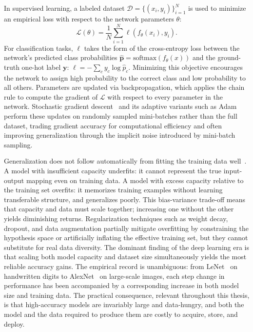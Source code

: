 \begin{foldable}
  In supervised learning, a labeled dataset $\mathcal{D} = \{(x_i, y_i)\}_{i=1}^{N}$ is used to minimize an empirical loss with respect to the network parameters $\theta$:
  \begin{equation}
    \label{eq:21-background-deeplearning-loss-supervised}
    \mathcal{L}(\theta) = \frac{1}{N}\sum_{i=1}^{N} \ell(f_{\theta}(x_i), y_i).
  \end{equation}
  For classification tasks, $\ell$ takes the form of the cross-entropy loss between the network's predicted class probabilities $\hat{\mathbf{p}} = \text{softmax}(f_\theta(x))$ and the ground-truth one-hot label $\mathbf{y}$: $\ell = -\sum_c y_c \log \hat{p}_c$.
  Minimizing this objective encourages the network to assign high probability to the correct class and low probability to all others.
  Parameters are updated via backpropagation, which applies the chain rule to compute the gradient of $\mathcal{L}$ with respect to every parameter in the network.
  Stochastic gradient descent~\cite{robbins1951stochastic} and its adaptive variants such as Adam~\cite{kingma2014adam} perform these updates on randomly sampled mini-batches rather than the full dataset, trading gradient accuracy for computational efficiency and often improving generalization through the implicit noise introduced by mini-batch sampling.
\end{foldable}

\begin{foldable}
  Generalization does not follow automatically from fitting the training data well~\cite{zhang2017understanding}.
  A model with insufficient capacity underfits: it cannot represent the true input-output mapping even on training data.
  A model with excess capacity relative to the training set overfits: it memorizes training examples without learning transferable structure, and generalizes poorly.
  This bias-variance trade-off means that capacity and data must scale together; increasing one without the other yields diminishing returns.
  Regularization techniques such as weight decay, dropout, and data augmentation partially mitigate overfitting by constraining the hypothesis space or artificially inflating the effective training set, but they cannot substitute for real data diversity.
  The dominant finding of the deep learning era is that scaling both model capacity and dataset size simultaneously yields the most reliable accuracy gains.
  The empirical record is unambiguous: from LeNet~\cite{lecun1998gradient} on handwritten digits to AlexNet~\cite{krizhevsky2012imagenet} on large-scale images, each step change in performance has been accompanied by a corresponding increase in both model size and training data.
  The practical consequence, relevant throughout this thesis, is that high-accuracy models are invariably large and data-hungry, and both the model and the data required to produce them are costly to acquire, store, and deploy.
\end{foldable}

